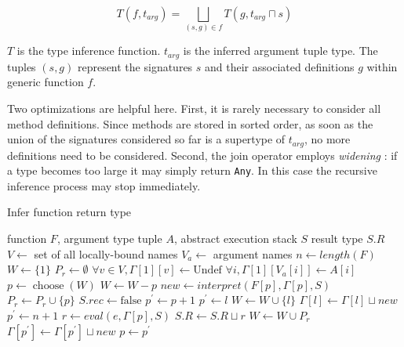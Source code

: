 \documentclass[9pt]{sigplanconf}
\begin{document}
\[
T(f,t_{arg}) = \bigsqcup_{(s,g) \in f}T(g,t_{arg} \sqcap s)
\]

\noindent
$T$ is the type inference function.
$t_{arg}$ is the inferred argument tuple type. The tuples $(s,g)$
represent the signatures $s$ and their associated definitions $g$ within
generic function $f$.

Two optimizations are helpful here. First, it is rarely
necessary to consider all method definitions. Since methods are stored in
sorted order, as soon as the union of the signatures considered so far is a
supertype of $t_{arg}$, no more definitions need to be considered.
Second, the join operator employs \emph{widening} \cite{widening}:
if a type becomes too large it may simply return {\tt Any}. In this case
the recursive inference process may stop immediately.



\begin{algorithm}
\caption{Infer function return type}
\label{alg1}
\begin{algorithmic}
\REQUIRE function $F$, argument type tuple $A$, abstract execution stack $S$
\ENSURE result type $S.R$
\STATE $V \leftarrow$ set of all locally-bound names
\STATE $V_{a} \leftarrow$ argument names
\STATE $n \leftarrow length(F)$
\STATE $W \leftarrow \{1\}$ 
\STATE $P_r \leftarrow \emptyset$ 
\STATE $\forall v \in V, \Gamma[1][v] \leftarrow \text{Undef}$
\STATE $\forall i, \Gamma[1][V_{a}[i]] \leftarrow A[i]$  
 \STATE $p \leftarrow \operatorname{choose}(W)$
 \REPEAT
  \STATE $W \leftarrow W - p$
  \STATE $new \leftarrow interpret(F[p],\Gamma[p],S)$
   \STATE $P_r \leftarrow P_r \cup \{p\}$
   \STATE $S.rec \leftarrow \text{false}$
  \ENDIF
  \STATE $p^{\prime} \leftarrow p+1$
   \STATE $p^{\prime} \leftarrow l$
    \STATE $W \leftarrow W \cup \{l\}$
    \STATE $\Gamma[l] \leftarrow \Gamma[l] \sqcup new$
   \ENDIF
   \STATE $p^{\prime} \leftarrow n+1$
   \STATE $r \leftarrow eval(e,\Gamma[p],S)$
    \STATE $S.R \leftarrow S.R \sqcup r$
    \STATE $W \leftarrow W \cup P_r$
   \ENDIF
  \ENDIF
   \STATE $\Gamma[p^{\prime}] \leftarrow \Gamma[p^{\prime}] \sqcup new$
   \STATE $p \leftarrow p^{\prime}$
  \ENDIF
\ENDWHILE
{}
\end{algorithmic}
\end{algorithm}
\end{document}
